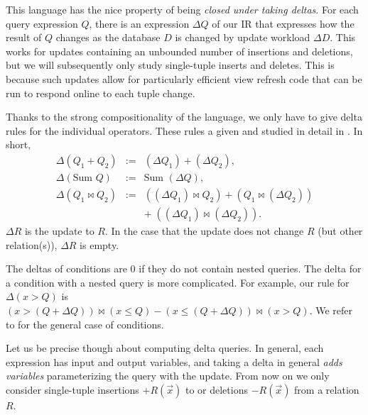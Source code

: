 This language has the nice property of being {\em closed under taking deltas}.
For each query expression $Q$, there
is an expression $\Delta Q$ of our IR that expresses how the result of $Q$ changes as the database $D$ is changed by update workload $\Delta D$. This works for updates containing an unbounded number of insertions and deletions, but we will subsequently only study single-tuple inserts and deletes.
This is because such updates allow for particularly efficient view refresh code that
can be run to respond online to each tuple change.


Thanks to the strong compositionality of the language, we only have to give delta rules for the 
individual operators. These rules a given and studied in detail in \cite{koch-pods:10}. In short,
\begin{eqnarray*}
\Delta(Q_1 + Q_2)    &:=& (\Delta Q_1) + (\Delta Q_2), \\ 
\Delta(\mbox{Sum } Q)   &:=& \mbox{Sum } (\Delta Q), \\
\Delta(Q_1 \bowtie Q_2) &:=& ((\Delta Q_1) \bowtie Q_2) + (Q_1 \bowtie (\Delta Q_2)) \\
&& +\; ((\Delta Q_1) \bowtie (\Delta Q_2)).
\end{eqnarray*}
$\Delta R$ is the update to $R$. In the case that the update does not change $R$ (but other relation(s)),
$\Delta R$ is empty.
 

The deltas of conditions are 0 if they do not contain nested queries. The delta for a condition with a nested query
is more complicated. For example, our rule for $\Delta (x > Q)$ is
$(x > (Q + \Delta Q)) \bowtie (x \le Q) - (x \le (Q + \Delta Q)) \bowtie (x > Q)$.
We refer to \cite{koch-pods:10} for the general case of conditions.

Let us be precise though about computing delta queries. In general, each expression has input and output variables,
and taking a delta in general {\em adds variables} parameterizing the query with the update. From now on we only consider single-tuple insertions $+R(\vec{x})$ to or deletions $-R(\vec{x})$ from a relation $R$.

\def\dxy{\Delta_{+R(x,y)}}

